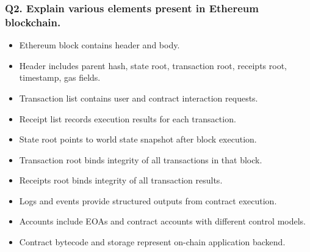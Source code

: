 \documentclass[12pt,a4paper]{article}
\begin{document}
\subsubsection*{Q2. Explain various elements present in Ethereum blockchain.}
\begin{itemize}
\item Ethereum block contains header and body.
\item Header includes parent hash, state root, transaction root, receipts root, timestamp, gas fields.
\item Transaction list contains user and contract interaction requests.
\item Receipt list records execution results for each transaction.
\item State root points to world state snapshot after block execution.
\item Transaction root binds integrity of all transactions in that block.
\item Receipts root binds integrity of all transaction results.
\item Logs and events provide structured outputs from contract execution.
\item Accounts include EOAs and contract accounts with different control models.
\item Contract bytecode and storage represent on-chain application backend.
\end{itemize}
\end{document}
